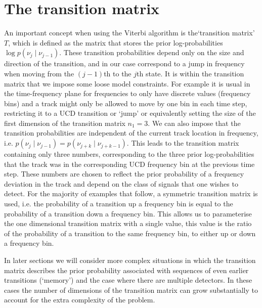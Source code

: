 \section{\label{soap:viterbi:transition}The transition matrix}
%
%
An important concept when using the Viterbi algorithm is the`transition matrix' $T$, which is defined as the matrix that stores the prior log-probabilities $\log p(\nu_j \mid \nu_{j-1})$. These transition probabilities depend only on the size and direction of the transition, and in our case correspond to a jump in frequency when moving from the $(j-1)$th to the $j$th state. It is within the transition matrix that we impose some loose model constraints. For example it is usual in the time-frequency plane for frequencies to only have discrete values (frequency bins) and a track might only be allowed to move by one bin in each time step, restricting it to a \gls{UCD} transition or `jump' or equivalently setting the size of the first dimension of the transition matrix $n_1 = 3$. We can also impose that the transition probabilities are independent of the current track location in frequency, i.e. $p(\nu_j \mid \nu_{j-1})=p(\nu_{j+k} \mid \nu_{j+k-1})$. This leads to the transition matrix containing only three numbers, corresponding to the three prior log-probabilities that the track was in the corresponding \gls{UCD} frequency bin at the previous time step. These numbers are chosen to reflect the prior probability of a frequency deviation in the track and depend on the class of signals that one wishes to detect.
For the majority of examples that follow, a symmetric transition matrix is used, i.e. the probability of a transition up a frequency bin is equal to the probability of a transition down a frequency bin. This allows us to parameterise the one dimensional transition matrix with a single value, this value is the ratio of the probability of a transition to the same frequency bin, to either up or down a frequency bin. 

In later sections we will consider more complex situations in which the transition matrix describes the prior probability associated with sequences of even earlier transitions (`memory') and the case where there are multiple detectors. In these cases the number of dimensions of the transition matrix can grow substantially to account for the extra complexity of the problem.

